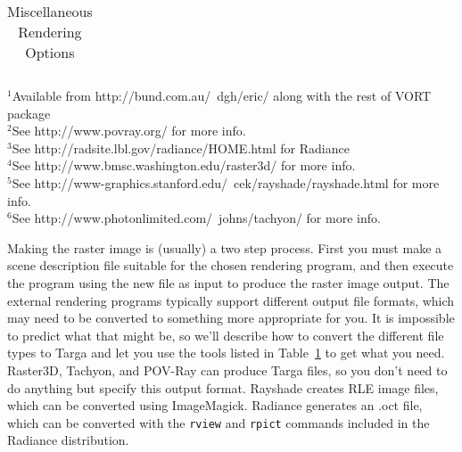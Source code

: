 \begin{table}[htb]
\begin{tabular}{|p{1.1 in}| p{2.5 in}| p{2.5in}| }
\end{tabular}
  $^1$Available from  
    {http://bund.com.au/~dgh/eric/} along with the rest of VORT package \\
  $^2$See 
    {http://www.povray.org/} for more info. \\
  $^3$See 
    {http://radsite.lbl.gov/radiance/HOME.html} for Radiance\\
  $^4$See 
    {http://www.bmsc.washington.edu/raster3d/} for more info. \\
  $^5$See 
    {http://www-graphics.stanford.edu/~cek/rayshade/rayshade.html} for more info.\\
  $^6$See 
    {http://www.photonlimited.com/~johns/tachyon/} for more info. \\
\caption{Miscellaneous Rendering Options}
\label{ug:table:render}
\end{table}

Making the raster image is (usually) a two step process.  First you must make
a scene description file suitable for the chosen rendering program, and then
execute the program using the new file as input to produce the raster
image output.  The external rendering programs typically
support different output file formats, which may need to be converted to
something more appropriate for you.  It is impossible to predict what
that might be, so we'll describe how to convert the different file types to
Targa and let you use the tools listed in Table~\ref{ug:table:render}
to get what you need.
Raster3D, Tachyon, and POV-Ray can produce Targa files, so you don't need 
to do anything but specify this output format.  
Rayshade creates RLE image files, which can be converted using ImageMagick.
Radiance generates an .oct file, which can be converted with the 
{\tt rview} and {\tt rpict} commands included in the Radiance distribution.


